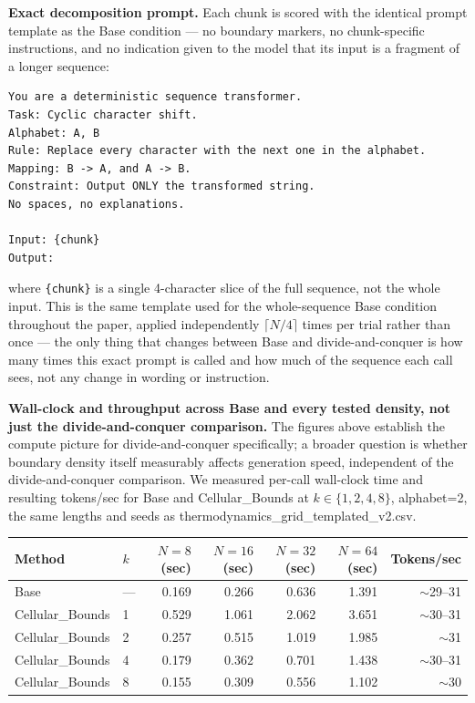 \documentclass[11pt]{article}
\begin{document}
\textbf{Exact decomposition prompt.} Each chunk is scored with the identical prompt template as the Base condition --- no boundary markers, no chunk-specific instructions, and no indication given to the model that its input is a fragment of a longer sequence:
\begin{verbatim}
You are a deterministic sequence transformer.
Task: Cyclic character shift.
Alphabet: A, B
Rule: Replace every character with the next one in the alphabet.
Mapping: B -> A, and A -> B.
Constraint: Output ONLY the transformed string.
No spaces, no explanations.

Input: {chunk}
Output: 
\end{verbatim}
where \texttt{\{chunk\}} is a single 4-character slice of the full sequence, not the whole input. This is the same template used for the whole-sequence Base condition throughout the paper, applied independently $\lceil N/4 \rceil$ times per trial rather than once --- the only thing that changes between Base and divide-and-conquer is how many times this exact prompt is called and how much of the sequence each call sees, not any change in wording or instruction.

\textbf{Wall-clock and throughput across Base and every tested density, not just the divide-and-conquer comparison.} The figures above establish the compute picture for divide-and-conquer specifically; a broader question is whether boundary density itself measurably affects generation speed, independent of the divide-and-conquer comparison. We measured per-call wall-clock time and resulting tokens/sec for Base and Cellular\_Bounds at $k\in\{1,2,4,8\}$, alphabet=2, the same lengths and seeds as thermodynamics\_grid\_templated\_v2.csv.

\begin{table}[htbp]
\centering
\small
\begin{tabular}{llrrrrr}
\toprule
Method & $k$ & $N=8$ (sec) & $N=16$ (sec) & $N=32$ (sec) & $N=64$ (sec) & Tokens/sec \\
\midrule
Base & --- & 0.169 & 0.266 & 0.636 & 1.391 & $\sim$29--31 \\
Cellular\_Bounds & 1 & 0.529 & 1.061 & 2.062 & 3.651 & $\sim$30--31 \\
Cellular\_Bounds & 2 & 0.257 & 0.515 & 1.019 & 1.985 & $\sim$31 \\
Cellular\_Bounds & 4 & 0.179 & 0.362 & 0.701 & 1.438 & $\sim$30--31 \\
Cellular\_Bounds & 8 & 0.155 & 0.309 & 0.556 & 1.102 & $\sim$30 \\
\bottomrule
\end{tabular}
\end{table}
\end{document}
